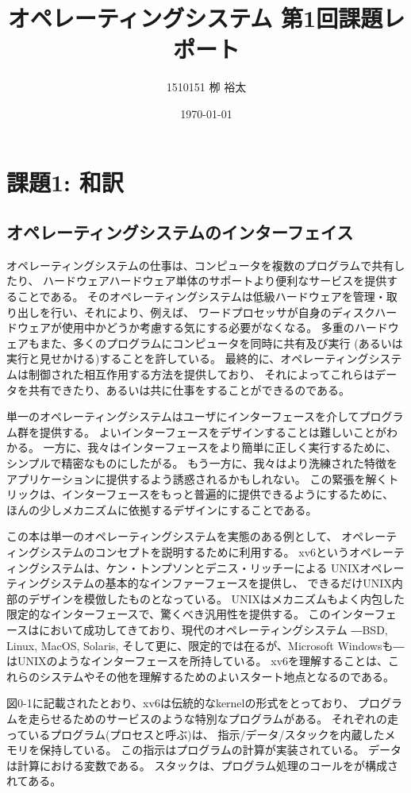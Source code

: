 \documentclass[11pt,a4paper, uplatex]{jsarticle}
\title{オペレーティングシステム 第1回課題レポート}
\author{1510151  栁 裕太}
\date{\today}
\begin{document}
\maketitle
\section{課題1: 和訳}

\subsection{オペレーティングシステムのインターフェイス}
オペレーティングシステムの仕事は、コンピュータを複数のプログラムで共有したり、
ハードウェアハードウェア単体のサポートより便利なサービスを提供することである。
そのオペレーティングシステムは低級ハードウェアを管理・取り出しを行い、それにより、例えば、
ワードプロセッサが自身のディスクハードウェアが使用中かどうか考慮する気にする必要がなくなる。
多重のハードウェアもまた、多くのプログラムにコンピュータを同時に共有及び実行
(あるいは実行と見せかける)することを許している。
最終的に、オペレーティングシステムは制御された相互作用する方法を提供しており、
それによってこれらはデータを共有できたり、あるいは共に仕事をすることができるのである。

単一のオペレーティングシステムはユーザにインターフェースを介してプログラム群を提供する。
よいインターフェースをデザインすることは難しいことがわかる。
一方に、我々はインターフェースをより簡単に正しく実行するために、シンプルで精密なものにしたがる。
もう一方に、我々はより洗練された特徴をアプリケーションに提供するよう誘惑されるかもしれない。
この緊張を解くトリックは、インターフェースをもっと普遍的に提供できるようにするために、
ほんの少しメカニズムに依拠するデザインにすることである。

この本は単一のオペレーティングシステムを実態のある例として、
オペレーティングシステムのコンセプトを説明するために利用する。
xv6というオペレーティングシステムは、ケン・トンプソンとデニス・リッチーによる
UNIXオペレーティングシステムの基本的なインファーフェースを提供し、
できるだけUNIX内部のデザインを模倣したものとなっている。
UNIXはメカニズムもよく内包した限定的なインターフェースで、驚くべき汎用性を提供する。
このインターフェースはにおいて成功してきており、現代のオペレーティングシステム
―BSD, Linux, MacOS, Solaris, そして更に、限定的では在るが、Microsoft Windowsも―
はUNIXのようなインターフェースを所持している。
xv6を理解することは、これらのシステムやその他を理解するためのよいスタート地点となるのである。

図0-1に記載されたとおり、xv6は伝統的なkernelの形式をとっており、
プログラムを走らせるためのサービスのような特別なプログラムがある。
それぞれの走っているプログラム(プロセスと呼ぶ)は、
指示/データ/スタックを内蔵したメモリを保持している。
この指示はプログラムの計算が実装されている。
データは計算における変数である。
スタックは、プログラム処理のコールをが構成されてある。
%
%
\end{document}
